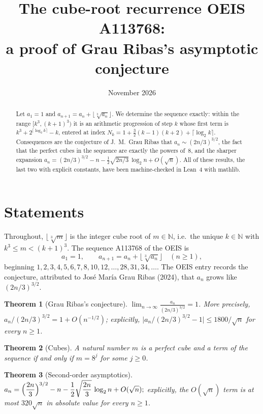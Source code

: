 \documentclass[11pt]{amsart}
\title[Grau Ribas's conjecture for A113768]{The cube-root recurrence OEIS A113768:\\ a proof of Grau Ribas's asymptotic conjecture}
\date{November 2026}
\newtheorem{theorem}{Theorem}
\theoremstyle{remark}
\newcommand{\cbrt}[1]{\bigl\lfloor\sqrt[3]{#1}\bigr\rfloor}
\begin{document}
\begin{abstract}
Let $a_1=1$ and $a_{n+1}=a_n+\cbrt{a_n}$. We determine the sequence exactly: within the
range $[k^3,(k+1)^3)$ it is an arithmetic progression of step $k$ whose first term is
$k^3+2^{\lceil\log_2 k\rceil}-k$, entered at index
$N_k=1+\tfrac32(k-1)(k+2)+\lceil\log_2 k\rceil$. Consequences are the conjecture of
J.~M.~Grau Ribas that $a_n\sim(2n/3)^{3/2}$, the fact that the perfect cubes in the sequence
are exactly the powers of~$8$, and the sharper expansion
$a_n=(2n/3)^{3/2}-n-\tfrac12\sqrt{2n/3}\,\log_2 n+O(\sqrt n)$.
All of these results, the last two with explicit constants, have been machine-checked in
Lean~4 with mathlib.
\end{abstract}

\maketitle

\section{Statements}

Throughout, $\cbrt{m}$ is the integer cube root of $m\in\mathbb N$, i.e.\ the unique
$k\in\mathbb N$ with $k^3\le m<(k+1)^3$. The sequence A113768 of the OEIS is
\[
  a_1=1,\qquad a_{n+1}=a_n+\cbrt{a_n}\quad(n\ge1),
\]
beginning $1,2,3,4,5,6,7,8,10,12,\dots,28,31,34,\dots$. The OEIS entry records the conjecture,
attributed to Jos\'e Mar\'ia Grau Ribas (2024), that $a_n$ grows like $(2n/3)^{3/2}$.

\begin{theorem}[Grau Ribas's conjecture]\label{thm:main}
$\displaystyle\lim_{n\to\infty}\frac{a_n}{(2n/3)^{3/2}}=1$. More precisely,
$a_n/(2n/3)^{3/2}=1+O(n^{-1/2})$; explicitly,
$\bigl|a_n/(2n/3)^{3/2}-1\bigr|\le 1800/\sqrt n$ for every $n\ge1$.
\end{theorem}

\begin{theorem}[Cubes]\label{thm:cubes}
A natural number $m$ is a perfect cube and a term of the sequence if and only if
$m=8^j$ for some $j\ge0$.
\end{theorem}

\begin{theorem}[Second-order asymptotics]\label{thm:second}
$\displaystyle a_n=\Bigl(\frac{2n}{3}\Bigr)^{3/2}-n-\frac12\sqrt{\frac{2n}{3}}\,\log_2 n+O(\sqrt n);$
explicitly, the $O(\sqrt n)$ term is at most $320\sqrt n$ in absolute value for every $n\ge1$.
\end{theorem}
\end{document}
